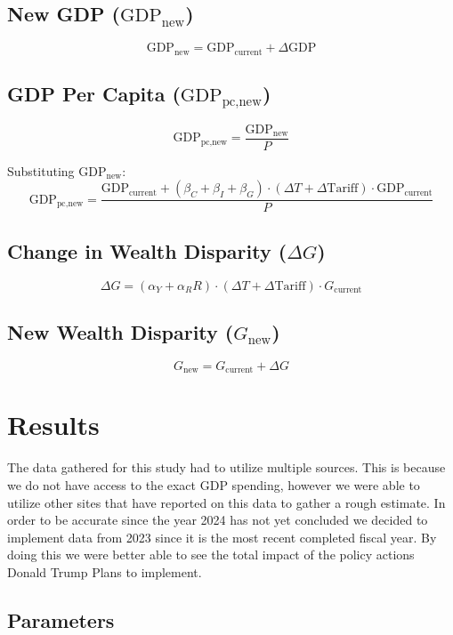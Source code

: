 \documentclass[12pt,letterpaper]{article}
\begin{document}
\subsection*{New GDP (\( \text{GDP}_{\text{new}} \))}

\[
\text{GDP}_{\text{new}} = \text{GDP}_{\text{current}} + \Delta \text{GDP}
\]

\subsection*{GDP Per Capita (\( \text{GDP}_{\text{pc,new}} \))}

\[
\text{GDP}_{\text{pc,new}} = \frac{\text{GDP}_{\text{new}}}{P}
\]

Substituting \( \text{GDP}_{\text{new}} \):
\[
\text{GDP}_{\text{pc,new}} = \frac{\text{GDP}_{\text{current}} + (\beta_C + \beta_I + \beta_G) \cdot (\Delta T + \Delta \text{Tariff}) \cdot \text{GDP}_{\text{current}}}{P}
\]

\subsection*{Change in Wealth Disparity (\( \Delta G \))}

\[
\Delta G = (\alpha_Y + \alpha_RR) \cdot (\Delta T + \Delta \text{Tariff}) \cdot G_{\text{current}}
\]

\subsection*{New Wealth Disparity (\( G_{\text{new}} \))}

\[
G_{\text{new}} = G_{\text{current}} + \Delta G
\]

\section{Results}

The data gathered for this study had to utilize multiple sources. This is because we do not have access to the exact GDP spending, however we were able to utilize other sites that have reported on this data to gather a rough estimate. In order to be accurate since the year 2024 has not yet concluded we decided to implement data from 2023 since it is the most recent completed fiscal year. By doing this we were better able to see the total impact of the policy actions Donald Trump Plans to implement.

\subsection{Parameters}
\end{document}
